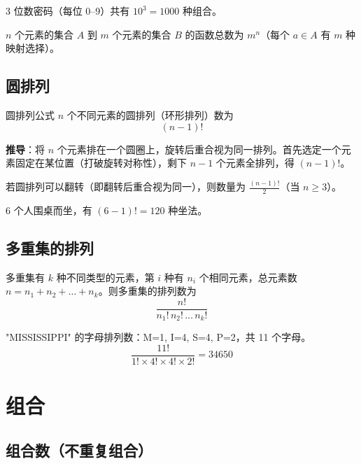 \begin{example}
3 位数密码（每位 0--9）共有 $10^3 = 1000$ 种组合。
\end{example}

\begin{example}
$n$ 个元素的集合 $A$ 到 $m$ 个元素的集合 $B$ 的函数总数为 $m^n$（每个 $a \in A$ 有 $m$ 种映射选择）。
\end{example}

\subsection{圆排列}

\begin{myTheorem}{圆排列公式}
$n$ 个不同元素的圆排列（环形排列）数为
\[
(n-1)!
\]
\end{myTheorem}

\textbf{推导}：将 $n$ 个元素排在一个圆圈上，旋转后重合视为同一排列。首先选定一个元素固定在某位置（打破旋转对称性），剩下 $n-1$ 个元素全排列，得 $(n-1)!$。

\begin{remark}
若圆排列可以翻转（即翻转后重合视为同一），则数量为 $\frac{(n-1)!}{2}$（当 $n \geq 3$）。
\end{remark}

\begin{example}
6 个人围桌而坐，有 $(6-1)! = 120$ 种坐法。
\end{example}

\subsection{多重集的排列}

\begin{mydefinition}{}
多重集有 $k$ 种不同类型的元素，第 $i$ 种有 $n_i$ 个相同元素，总元素数 $n = n_1 + n_2 + \dots + n_k$。则多重集的排列数为
\[
\frac{n!}{n_1!\, n_2!\, \dots\, n_k!}
\]
\end{mydefinition}

\begin{example}
"MISSISSIPPI" 的字母排列数：M=1, I=4, S=4, P=2，共 11 个字母。
\[
\frac{11!}{1! \times 4! \times 4! \times 2!} = 34650
\]
\end{example}

\section{组合}

\subsection{组合数（不重复组合）}

